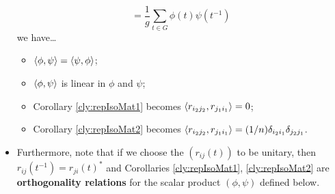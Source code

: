 \documentclass[../notes.tex]{subfiles}
\begin{document}
\begin{itemize}
\begin{equation*}
        = \frac{1}{g}\sum_{t\in G}\phi(t)\psi(t^{-1})
    \end{equation*}
    we have\dots
    \begin{itemize}
        \item $\left\langle{\phi,\psi}\right\rangle=\left\langle{\psi,\phi}\right\rangle$;
        \item $\left\langle{\phi,\psi}\right\rangle$ is linear in $\phi$ and $\psi$;
        \item Corollary \ref{cly:repIsoMat1} becomes $\left\langle{r_{i_2j_2},r_{j_1i_1}}\right\rangle=0$;
        \item Corollary \ref{cly:repIsoMat2} becomes $\left\langle{r_{i_2j_2},r_{j_1i_1}}\right\rangle=(1/n)\delta_{i_2i_1}\delta_{j_2j_1}$.
    \end{itemize}
    \item Furthermore, note that if we choose the $(r_{ij}(t))$ to be unitary, then $r_{ij}(t^{-1})=r_{ji}(t)^*$ and Corollaries \ref{cly:repIsoMat1}, \ref{cly:repIsoMat2} are \textbf{orthogonality relations} for the scalar product $(\phi,\psi)$ defined below.
\end{itemize}
\end{document}
